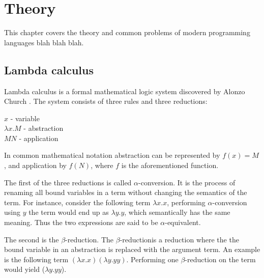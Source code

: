 \newcommand{\aconv}[0]{$\alpha$-conversion}
\newcommand{\bred}[0]{$\beta$-reduction}
\newcommand{\ered}[0]{$\eta$-reduction}
\chapter{Theory}
This chapter covers the theory and common problems of modern programming languages blah blah blah.

\section{Lambda calculus} \label{Lambda calculus}

Lambda calculus is a formal mathematical logic system discovered by Alonzo Church \citep{church}. 
The system consists of three rules and three reductions:
\newline
\begin{center}
    $x$ - variable \\
    $\lambda x. M$ - abstraction \\
    $M N$ - application \\
\end{center}

In common mathematical notation abstraction can be represented by $f(x) = M$, and application by $f(N)$, where $f$ is the aforementioned function.
\newline

The first of the three reductions is called \aconv{}. It is the process of renaming all bound variables in a term without changing the semantics
of the term. For instance, consider the following term $\lambda x . x$, performing \aconv{} using $y$ the term would end up as $\lambda y. y$, which semantically has the same meaning. Thus the two expressions are said to be $\alpha$-equivalent.
\newline

The second is the \bred{}. The \bred is a reduction where the the bound variable in an abstraction is replaced with the argument term.
An example is the following term $(\lambda x. x) (\lambda y. y y)$. Performing one \bred{} on the term would yield ($\lambda y. y y$).
\newline

